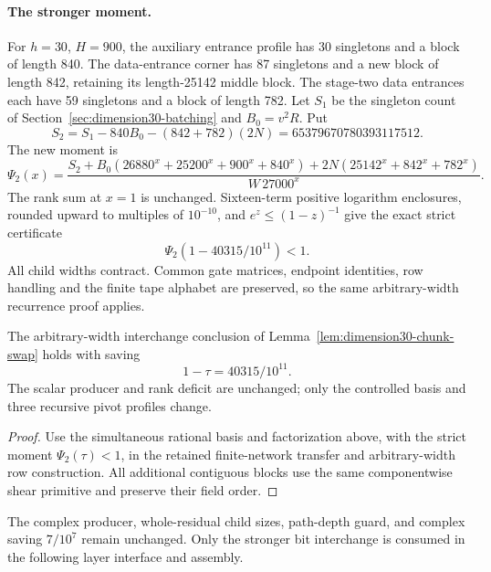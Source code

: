 \paragraph{The stronger moment.}
For $h=30$, $H=900$, the auxiliary entrance profile has 30 singletons
and a block of length 840. The data-entrance corner has 87 singletons
and a new block of length 842, retaining its length-25142 middle block.
The stage-two data entrances each have 59 singletons and a block of
length 782.
Let $S_1$ be the singleton count of Section~\ref{sec:dimension30-batching}
and $B_0=v^2R$. Put
\[
 S_2=S_1-840B_0-(842+782)(2N)=65379670780393117512.
\]
The new moment is
\[
 \Psi_2(x)=\frac{S_2+B_0(26880^x+25200^x+900^x+840^x)
                    +2N(25142^x+842^x+782^x)}{W\,27000^x}.
\]
The rank sum at $x=1$ is unchanged. Sixteen-term positive logarithm
enclosures, rounded upward to multiples of $10^{-10}$, and
$e^z\le(1-z)^{-1}$ give the exact strict certificate
\[
 \Psi_2(1-40315/10^{11})<1.
\]
All child widths contract. Common gate matrices, endpoint identities,
row handling and the finite tape alphabet are preserved, so the same
arbitrary-width recurrence proof applies.

\begin{lemma}
\label{lem:controlled-corner-chunk-swap}
The arbitrary-width interchange conclusion of
Lemma~\ref{lem:dimension30-chunk-swap} holds with saving
\[1-\tau=40315/10^{11}.\]
The scalar producer and rank deficit are unchanged;
only the controlled basis and three recursive pivot profiles change.
\end{lemma}
\begin{proof}
Use the simultaneous rational basis and factorization above, with the
strict moment $\Psi_2(\tau)<1$, in the retained finite-network transfer
and arbitrary-width row construction. All additional contiguous blocks
use the same componentwise shear primitive and preserve their field order.
\end{proof}

The complex producer, whole-residual child sizes, path-depth guard,
and complex saving $7/10^7$ remain unchanged. Only the stronger bit
interchange is consumed in the following layer interface and assembly.

